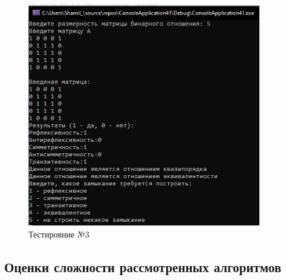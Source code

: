 \documentclass[bachelor, och, labwork]{shiza}
\begin{document}
	
	\begin{figure}[H]
		\centering
		\includegraphics[width=0.9\textwidth]{test3}
		\caption{Тестировние №3}
		\label{fig:test3}
	\end{figure}

	\subsection{Оценки сложности рассмотренных алгоритмов }
	
\end{document}

